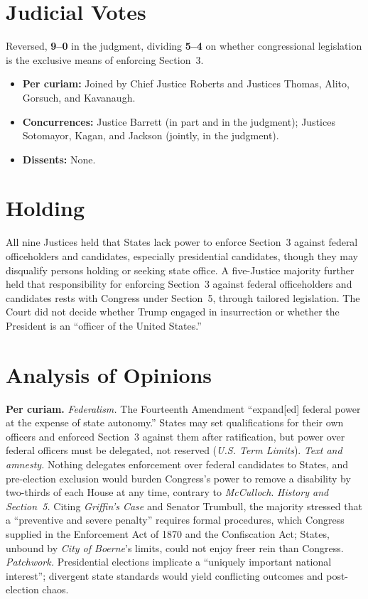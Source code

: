 \documentclass[12pt]{article}
\begin{document}
\section{Judicial Votes}

Reversed, \textbf{9--0} in the judgment, dividing \textbf{5--4} on whether congressional legislation is the exclusive means of enforcing Section~3.
\begin{itemize}
\item \textbf{Per curiam:} Joined by Chief Justice Roberts and Justices Thomas, Alito, Gorsuch, and Kavanaugh.
\item \textbf{Concurrences:} Justice Barrett (in part and in the judgment); Justices Sotomayor, Kagan, and Jackson (jointly, in the judgment).
\item \textbf{Dissents:} None.
\end{itemize}

\section{Holding}

All nine Justices held that States lack power to enforce Section~3 against federal officeholders and candidates, especially presidential candidates, though they may disqualify persons holding or seeking state office. A five-Justice majority further held that responsibility for enforcing Section~3 against federal officeholders and candidates rests with Congress under Section~5, through tailored legislation. The Court did not decide whether Trump engaged in insurrection or whether the President is an ``officer of the United States.''

\section{Analysis of Opinions}

\textbf{Per curiam.} \textit{Federalism.} The Fourteenth Amendment ``expand[ed] federal power at the expense of state autonomy.'' States may set qualifications for their own officers and enforced Section~3 against them after ratification, but power over federal officers must be delegated, not reserved (\textit{U.S. Term Limits}). \textit{Text and amnesty.} Nothing delegates enforcement over federal candidates to States, and pre-election exclusion would burden Congress's power to remove a disability by two-thirds of each House at any time, contrary to \textit{McCulloch}. \textit{History and Section~5.} Citing \textit{Griffin's Case} and Senator Trumbull, the majority stressed that a ``preventive and severe penalty'' requires formal procedures, which Congress supplied in the Enforcement Act of 1870 and the Confiscation Act; States, unbound by \textit{City of Boerne}'s limits, could not enjoy freer rein than Congress. \textit{Patchwork.} Presidential elections implicate a ``uniquely important national interest''; divergent state standards would yield conflicting outcomes and post-election chaos.
\end{document}

